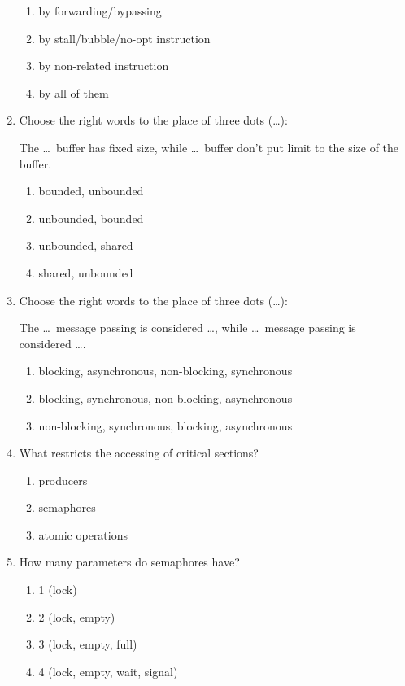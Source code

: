\documentclass[paper=8.5in:11in]{scrartcl}
\begin{document}
\begin{enumerate}
\begin{enumerate}[label=\alph*)]
\item by forwarding/bypassing
\item by stall/bubble/no-opt instruction
\item by non-related instruction
\item by all of them
\end{enumerate}

\item Choose the right words to the place of three dots (\ldots):

The \ldots \ buffer has fixed size, while \ldots \ buffer don’t put limit to the size of the buffer.
\begin{enumerate}[label=\alph*)]

\item bounded, unbounded
\item unbounded, bounded
\item unbounded, shared
\item shared, unbounded

\end{enumerate}

\item Choose the right words to the place of three dots (\ldots):

The \ldots \ message passing is considered \ldots, while \ldots \ message passing is considered \ldots.
\begin{enumerate}[label=\alph*)]

\item blocking, asynchronous, non-blocking, synchronous
\item blocking, synchronous, non-blocking, asynchronous
\item non-blocking, synchronous, blocking, asynchronous
\end{enumerate}

\item What restricts the accessing of critical sections?

\begin{enumerate}[label=\alph*)]
\item producers
\item semaphores
\item atomic operations
\end{enumerate}

\item How many parameters do semaphores have?
\begin{enumerate}[label=\alph*)]
\item 1 (lock)
\item 2 (lock, empty)
\item 3 (lock, empty, full)
\item 4 (lock, empty, wait, signal)
\end{enumerate}


\end{enumerate}
\end{document}
